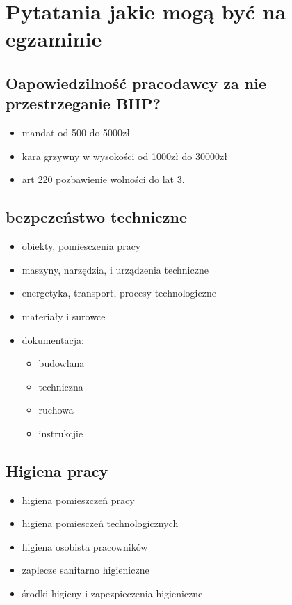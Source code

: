 \documentclass[11pt]{article}
\author{Rafał Grot}
\date{\today}
\title{}
\begin{document}
\tableofcontents

\section{Pytatania jakie mogą być na egzaminie}
\label{sec:org31e3b30}
\subsection{Oapowiedzilność pracodawcy za nie przestrzeganie BHP?}
\label{sec:org7ff5fed}
\begin{itemize}
\item mandat od 500 do 5000zł
\item kara grzywny w wysokości od 1000zł do 30000zł
\item art 220 pozbawienie wolności do lat 3.
\end{itemize}
\subsection{bezpczeństwo techniczne}
\label{sec:org953c4a8}
\begin{itemize}
\item obiekty, pomiesczenia pracy
\item maszyny, narzędzia, i urządzenia techniczne
\item energetyka, transport, procesy technologiczne
\item materiały i surowce
\item dokumentacja:
\begin{itemize}
\item budowlana
\item techniczna
\item ruchowa
\item instrukcjie
\end{itemize}
\end{itemize}
\subsection{Higiena pracy}
\label{sec:org1f47017}
\begin{itemize}
\item higiena pomieszczeń pracy
\item higiena pomiesczeń technologicznych
\item higiena osobista pracowników
\item zaplecze sanitarno higieniczne
\item środki higieny i zapezpieczenia higieniczne
\end{itemize}
\end{document}
